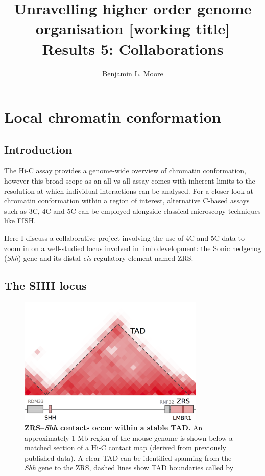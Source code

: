 \documentclass[a4paper,11pt,oneside]{book}
\title{ \vspace{3in} Unravelling higher order genome organisation {\small [working
    title]} \\ \vspace{2em} {\large {\bf Results 5: Collaborations}} }
\author{Benjamin L. Moore}
\begin{document}

\chapter{Local chromatin conformation}\label{chap:shh}

\section{Introduction}

The Hi-C assay provides a genome-wide overview of chromatin conformation, however this broad scope as an all-vs-all assay comes with inherent limits to the resolution at which individual interactions can be analysed. For a closer look at chromatin conformation within a region of interest, alternative C-based assays such as 3C, 4C and 5C can be employed alongside classical microscopy techniques like FISH.

Here I discuss a collaborative project involving the use of 4C and 5C data to zoom in on a well-studied locus involved in limb development: the Sonic hedgehog (\emph{Shh}) gene and its distal \emph{cis}-regulatory element named ZRS.

\section{The SHH locus}

\begin{figure}
\begin{center} 
\includegraphics[width=3.5in]{figs/shhtad.png}
\captionsetup{width=\textwidth} 
\caption[ZRS--\emph{Shh} contacts occur within a stable TAD.]{ {\bf ZRS--\emph{Shh} contacts occur within a stable TAD. }
An approximately 1 Mb region of the mouse genome is shown below a matched section of a Hi-C contact map (derived from previously published data\cite{Dixon2012}). A clear TAD can be identified spanning from the \emph{Shh} gene to the ZRS, dashed lines show TAD boundaries called by \citet{Dixon2012} %
}\label{fig:shhtad}
\end{center} 
\end{figure} 
\end{document}

